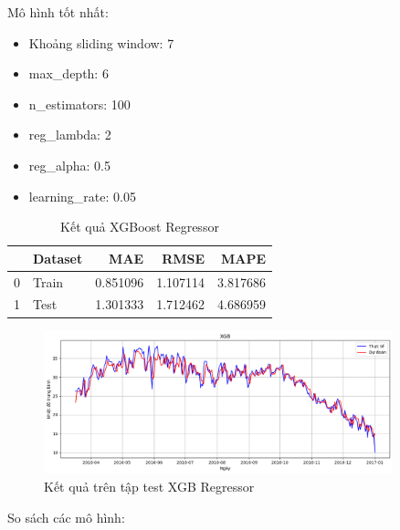\begin{itemize}
            Mô hình tốt nhất:
            \begin{itemize}
                \item Khoảng sliding window: 7
                \item max\_depth: 6
                \item n\_estimators: 100
                \item reg\_lambda: 2
                \item reg\_alpha: 0.5
                \item learning\_rate: 0.05
            \end{itemize}

            \begin{table}[htbp]
                \centering
                \caption{Kết quả XGBoost Regressor}
                \label{tab:weather-meantemp-xgb}
                \begin{tabular}{llrrr}
                \hline
                 & Dataset & MAE & RMSE & MAPE \\
                \hline
                0 & Train & 0.851096 & 1.107114 & 3.817686 \\
                1 & Test & 1.301333 & 1.712462 & 4.686959 \\
                \hline
                \end{tabular}
            \end{table}

            \FloatBarrier

            \begin{figure}[htp]
                \centering
                \includegraphics[width=0.90\textwidth]{images/TS_weather_pred_cmp_XGB.png}
                \caption{Kết quả trên tập test XGB Regressor}
                \label{fig:TS_weather_pred_cmp_XGB}
            \end{figure}
            \FloatBarrier
    \end{itemize}

    So sách các mô hình:

